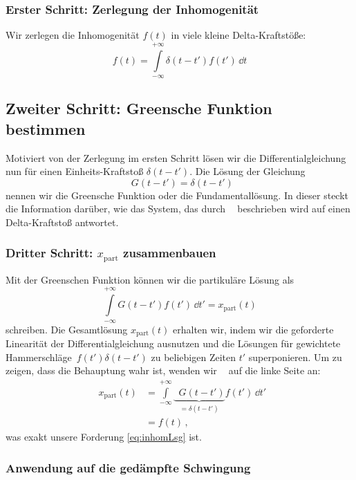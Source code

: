 \documentclass[paper=a4, fontsize=11.0pt, abstractoff, DIV12]{scrartcl}
\newcommand{\xinhom}{\ensuremath{x_\mathrm{part}}}
\DeclareMathOperator{\Dt}{\mathcal{D}_t}
\begin{document}
\subsubsection{Erster Schritt: Zerlegung der Inhomogenität}

Wir zerlegen die Inhomogenität $f(t)$ in viele kleine Delta-Kraftstöße:
\begin{equation}
f(t) = \int\limits_{-\infty}^{+\infty}\delta(t-t')f(t')\,\dd t
\end{equation}

\subsection{Zweiter Schritt: Greensche Funktion bestimmen}

Motiviert von der Zerlegung im ersten Schritt lösen wir die
Differentialgleichung nun für einen Einheits-Kraftstoß $\delta(t-t')$. Die
Lösung der Gleichung
\begin{equation}
\Dt G(t-t') = \delta(t-t')
\end{equation}
nennen wir die Greensche Funktion oder die Fundamentallösung. In dieser
steckt die Information darüber, wie das System, das durch $\Dt$ beschrieben
wird auf einen Delta-Kraftstoß antwortet.

\subsubsection{Dritter Schritt: $\xinhom$ zusammenbauen}

Mit der Greenschen Funktion können wir die partikuläre Lösung als
\begin{equation}
\int\limits_{-\infty}^{+\infty} G(t-t') f(t') \,\dd t' = \xinhom(t)
\label{eq:InhomLsg}
\end{equation}
schreiben. Die Gesamtlösung $\xinhom(t)$ erhalten wir, indem wir die
geforderte Linearität der Differentialgleichung ausnutzen und die Lösungen
für gewichtete \glqq Hammerschläge\grqq~$f(t')\delta(t-t')$ zu beliebigen
Zeiten $t'$ superponieren. Um zu zeigen, dass die Behauptung wahr ist,
wenden wir $\Dt$ auf die linke Seite an:
\begin{align}
\Dt \xinhom(t) &= \int\limits_{-\infty}^{+\infty} \underbrace{\Dt G(t-t')}_{=\delta(t-t')} f(t') \,\dd t'\\
&=f(t)\,,
\end{align}
was exakt unsere Forderung \eqref{eq:inhomLsg} ist.

\subsubsection{Anwendung auf die gedämpfte Schwingung}
\end{document}
